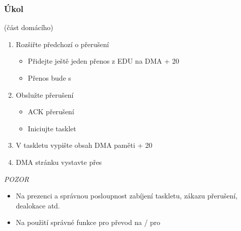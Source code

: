 \begin{frame}
  \frametitle{Úkol}

   \iffimuni (část domácího) \fi
  \begin{enumerate}
    \item Rozšiřte předchozí o přerušení
    \begin{itemize}
      \item Přidejte ještě jeden přenos z EDU na DMA + 20
      \item Přenos bude s 
    \end{itemize}

    \item Obslužte přerušení
    \begin{itemize}
      \item ACK přerušení
      \item Iniciujte tasklet
    \end{itemize}

    \item V taskletu vypište obsah DMA paměti + 20
    \item DMA stránku vystavte přes 
  \end{enumerate}

  \bigskip

  \emph{POZOR}
  \begin{itemize}
    \item Na prezenci a správnou posloupnost zabíjení taskletu, zákazu
      přerušení, dealokace atd.
    \item Na použití správné funkce pro převod na /
      pro 
  \end{itemize}

\end{frame}

\fi
